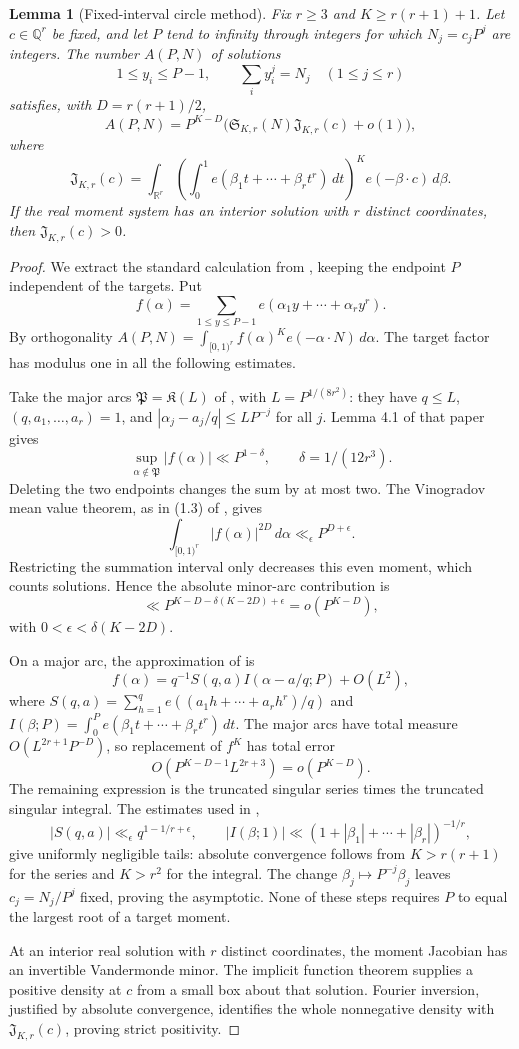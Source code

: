 \documentclass[11pt]{article}
\newtheorem{lemma}[theorem]{Lemma}
\newcommand{\Q}{\mathbb Q}
\begin{document}
\begin{lemma}[Fixed-interval circle method]\label{circle}
Fix $r\ge3$ and $K\ge r(r+1)+1$. Let $c\in\Q^r$ be fixed, and let
$P$ tend to infinity through integers for which $N_j=c_jP^j$ are
integers. The number $A(P,N)$ of solutions
\[
 1\le y_i\le P-1,\qquad\sum_i y_i^j=N_j\quad(1\le j\le r)
\]
satisfies, with $D=r(r+1)/2$,
\[
 A(P,N)=P^{K-D}\bigl(\mathfrak S_{K,r}(N)\mathfrak J_{K,r}(c)+o(1)\bigr),
\]
where
\[
 \mathfrak J_{K,r}(c)=\int_{\mathbb R^r}
 \left(\int_0^1e(\beta_1t+\cdots+\beta_rt^r)\,dt\right)^K
 e(-\beta\cdot c)\,d\beta.
\]
If the real moment system has an interior solution with $r$ distinct
coordinates, then $\mathfrak J_{K,r}(c)>0$.
\end{lemma}
\begin{proof}
We extract the standard calculation from \cite[Sections 3--6]{wooley},
keeping the endpoint $P$ independent of the targets. Put
\[
 f(\alpha)=\sum_{1\le y\le P-1}e(\alpha_1y+\cdots+\alpha_ry^r).
\]
By orthogonality $A(P,N)=\int_{[0,1)^r}f(\alpha)^K
 e(-\alpha\cdot N)\,d\alpha$. The target factor has modulus one
in all the following estimates.

Take the major arcs $\mathfrak P=\mathfrak K(L)$ of
\cite[Section 3]{wooley}, with $L=P^{1/(8r^2)}$: they have
$q\le L$, $(q,a_1,\ldots,a_r)=1$, and
$|\alpha_j-a_j/q|\le LP^{-j}$ for all $j$.
Lemma 4.1 of that paper gives
\[
 \sup_{\alpha\notin\mathfrak P}|f(\alpha)|\ll P^{1-\delta},
 \qquad\delta=1/(12r^3).
\]
Deleting the two endpoints changes the sum by at most two. The
Vinogradov mean value theorem, as in (1.3) of \cite{wooley}, gives
\[
 \int_{[0,1)^r}|f(\alpha)|^{2D}\,d\alpha\ll_\epsilon P^{D+\epsilon}.
\]
Restricting the summation interval only decreases this even moment,
which counts solutions. Hence the absolute minor-arc contribution is
\[
 \ll P^{K-D-\delta(K-2D)+\epsilon}=o(P^{K-D}),
\]
with $0<\epsilon<\delta(K-2D)$.

On a major arc, the approximation of \cite[Section 6]{wooley} is
\[
 f(\alpha)=q^{-1}S(q,a)I(\alpha-a/q;P)+O(L^2),
\]
where $S(q,a)=\sum_{h=1}^qe((a_1h+\cdots+a_rh^r)/q)$ and
$I(\beta;P)=\int_0^Pe(\beta_1t+\cdots+\beta_rt^r)\,dt$.
The major arcs have total measure $O(L^{2r+1}P^{-D})$, so replacement
of $f^K$ has total error
\[
 O(P^{K-D-1}L^{2r+3})=o(P^{K-D}).
\]
The remaining expression is the truncated singular series times the
truncated singular integral. The estimates used in
\cite[Section 6]{wooley},
\[
 |S(q,a)|\ll_\epsilon q^{1-1/r+\epsilon},\qquad
 |I(\beta;1)|\ll(1+|\beta_1|+\cdots+|\beta_r|)^{-1/r},
\]
give uniformly negligible tails: absolute convergence follows from
$K>r(r+1)$ for the series and $K>r^2$ for the integral. The change
$\beta_j\mapsto P^{-j}\beta_j$ leaves $c_j=N_j/P^j$ fixed, proving
the asymptotic. None of these steps requires $P$ to equal the largest
root of a target moment.

At an interior real solution with $r$ distinct coordinates, the moment
Jacobian has an invertible Vandermonde minor. The implicit function
theorem supplies a positive density at $c$ from a small box about that
solution. Fourier inversion, justified by absolute convergence, identifies
the whole nonnegative density with $\mathfrak J_{K,r}(c)$, proving
strict positivity.
\end{proof}
\end{document}
